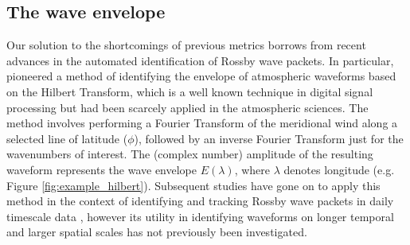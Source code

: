 \subsection{The wave envelope}

Our solution to the shortcomings of previous metrics borrows from recent advances in the automated identification of Rossby wave packets. In particular, \citet{Zimin2003} pioneered a method of identifying the envelope of atmospheric waveforms based on the Hilbert Transform, which is a well known technique in digital signal processing but had been scarcely applied in the atmospheric sciences. The method involves performing a Fourier Transform of the meridional wind along a selected line of latitude ($\phi$), followed by an inverse Fourier Transform just for the wavenumbers of interest. The (complex number) amplitude of the resulting waveform represents the wave envelope $E(\lambda)$, where $\lambda$ denotes longitude (e.g. Figure \ref{fig:example_hilbert}). Subsequent studies have gone on to apply this method in the context of identifying and tracking Rossby wave packets in daily timescale data \citep{Glatt2014,Souders2014a}, however its utility in identifying waveforms on longer temporal and larger spatial scales has not previously been investigated.
